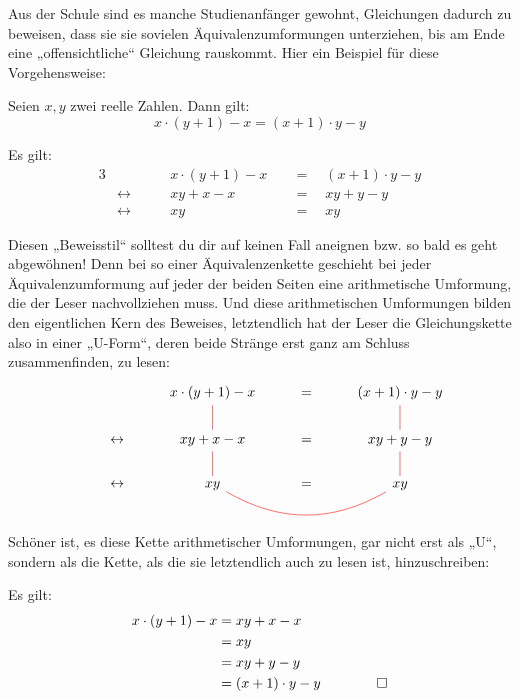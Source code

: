 \begin{bem}[„Gleichungs-U's“]
    Aus der Schule sind es manche Studienanfänger gewohnt, Gleichungen dadurch zu beweisen, dass sie sie sovielen Äquivalenzumformungen unterziehen, bis am Ende eine „offensichtliche“ Gleichung rauskommt. Hier ein Beispiel für diese Vorgehensweise:
    \begin{bsp}
    Seien $x,y$ zwei reelle Zahlen. Dann gilt:
        \[ x\cdot (y+1)-x = (x+1)\cdot y-y\]
    \end{bsp}
    \begin{bew}
        Es gilt:
        \begin{alignat*}{3}
            && x\cdot (y+1)-x& \quad=\quad (x+1)\cdot y-y \\
            &\leftrightarrow\qquad& xy + x  -x& \quad=\quad xy + y - y \\
            &\leftrightarrow\qquad& xy & \quad=\quad xy
        \end{alignat*}
    \end{bew}
    Diesen „Beweisstil“ solltest du dir auf keinen Fall aneignen bzw. so bald es geht abgewöhnen! Denn bei so einer Äquivalenzenkette geschieht bei jeder Äquivalenzumformung auf jeder der beiden Seiten eine arithmetische Umformung, die der Leser nachvollziehen muss. Und diese arithmetischen Umformungen bilden den eigentlichen Kern des Beweises, letztendlich hat der Leser die Gleichungskette also in einer „U-Form“, deren beide Stränge erst ganz am Schluss zusammenfinden, zu lesen:
    \[\begin{tikzcd}
        && x\cdot (y+1)-x\ar[red, d, dash] & =& (x+1)\cdot y-y \ar[red, d, dash] \\
        &\leftrightarrow& xy + x-x  \ar[red, d, dash] & =& xy + y - y \ar[red, d, dash] \\
        &\leftrightarrow& xy \ar[red, rr, dash, bend right] & =& xy
    \end{tikzcd}\]
    Schöner ist, es diese Kette arithmetischer Umformungen, gar nicht erst als „U“, sondern als die Kette, als die sie letztendlich auch zu lesen ist, hinzuschreiben:
    \begin{bew}
        Es gilt:
        \begin{align*}
            x\cdot (y+1) -x& = xy + x -x\\
            & = xy  \\
            & = xy + y - y \\
            & = (x+1)\cdot y -y  &&& \qed
        \end{align*}

\end{bew}
\end{bem}
